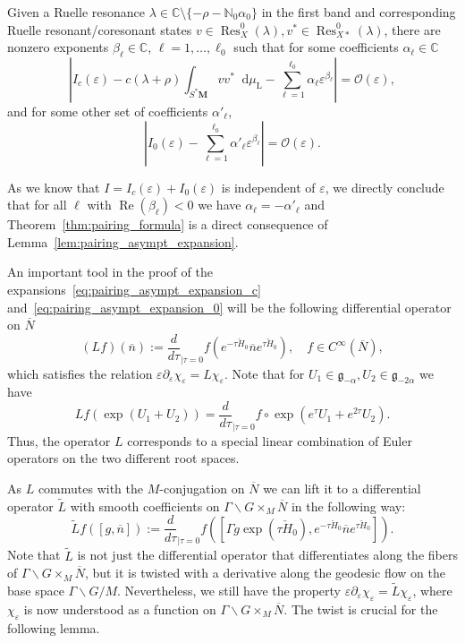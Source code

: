 \documentclass[AHL, Unicode, longabstracts, published]{cedram}
\DeclareMathOperator{\Res}{Res}
\DeclareMathOperator{\Real}{Re}
\newcommand{\rml}{\mathrm{L}}
\newcommand{\mc}{\mathcal}
\newcommand{\cc}{\mathbb{C}}
\newcommand{\til}{\widetilde}
\newcommand{\N}{\mathbb{N}}
\newcommand{\intd}{\mathop{}\!\mathrm{d}}
\newcommand{\g}{\mathfrak g}
\newcommand{\bn}{{\overline{n}}}
\newcommand{\bN}{{\overline{N}}}
\newcommand{\cH}{{\check{H}_0}}
\begin{document}
\begin{lemm}\label{lem:pairing_asympt_expansion}
Given a Ruelle resonance $\lambda\in\cc\setminus\{-\rho - \N_0\alpha_0\}$ in the first band and corresponding Ruelle resonant/coresonant states $v\in\Res_X^0(\lambda), v^*\in\Res_{X*}^0(\lambda)$, there are nonzero exponents $\beta_\ell\in\cc$, $\ell=1,\ldots, \ell_0$ such that for some coefficients $\alpha_\ell \in\cc$
\begin{equation}\label{eq:pairing_asympt_expansion_c}
\left|I_c(\varepsilon) - c(\lambda + \rho) \int_{S^*\mathbf M} vv^*\intd \mu_{\rml} - \sum_{\ell=1}^{\ell_0} \alpha_\ell \varepsilon^{\beta_\ell}\right| = \mc{O}(\varepsilon),
\end{equation}
and for some other set of coefficients $\alpha'_\ell$,
\begin{equation}\label{eq:pairing_asympt_expansion_0}
\left|I_0(\varepsilon) - \sum_{\ell=1}^{\ell_0} \alpha'_\ell \varepsilon^{\beta_\ell}\right| = \mc{O}(\varepsilon).
\end{equation}
\end{lemm}

\begin{rema}
As we know that $I=I_c(\varepsilon)+I_0(\varepsilon)$ is independent of $\varepsilon$, we directly conclude that for all $\ell$ with $\Real(\beta_\ell)< 0$ we have $\alpha_\ell=-\alpha'_\ell$ and Theorem~\ref{thm:pairing_formula} is a direct consequence of Lemma~\ref{lem:pairing_asympt_expansion}.
\end{rema}


An important tool in the proof of the expansions~\eqref{eq:pairing_asympt_expansion_c} and~\eqref{eq:pairing_asympt_expansion_0} will be the following differential operator on $\bN$
\[
(L f)(\bn) := \frac{d}{d\tau}_{|\tau=0} f\left(e^{-\tau \cH}\bn e^{\tau \cH}\right),\quad f\in C^\infty(\bN),
\]
which satisfies the relation $\varepsilon\partial_{\varepsilon}\chi_\varepsilon = L\chi_\varepsilon$. Note that for $U_1\in \g_{-\alpha}, U_2\in\g_{-2\alpha}$ we have
\begin{equation}\label{eq:L_Euler}
Lf(\exp (U_1+U_2)) = \frac{d}{d\tau}_{|\tau=0} f\circ\exp\left(e^\tau U_1 + e^{2\tau} U_2\right).
\end{equation}
Thus, the operator $L$ corresponds to a special linear combination of Euler operators on the two different root spaces.



As $L$ commutes with the $M$-conjugation on $\bN$ we can lift it to a differential operator $\til L$ with smooth coefficients on $\Gamma\backslash G\times_M\bN$ in the following way:
\[
\til L f([g,\bn]) := \frac{d}{d\tau}_{|\tau=0} f\left(\left[\Gamma g\exp\left(\tau \check H_0\right), e^{-\tau\cH}\bn e^{\tau\cH}\right]\right).
\]
Note that $\til L$ is not just the differential operator that differentiates along the fibers of $\Gamma\backslash G\times_M\bN$, but it is twisted with a derivative along the geodesic flow on the base space $ \Gamma \backslash G/M$. Nevertheless, we still have the property $\varepsilon\partial_\varepsilon \chi_\varepsilon = \til L\chi_\varepsilon$, where $\chi_\varepsilon$ is now understood as a function on $\Gamma\backslash G\times_M\bN$. The twist is crucial for the following lemma.
\end{document}
